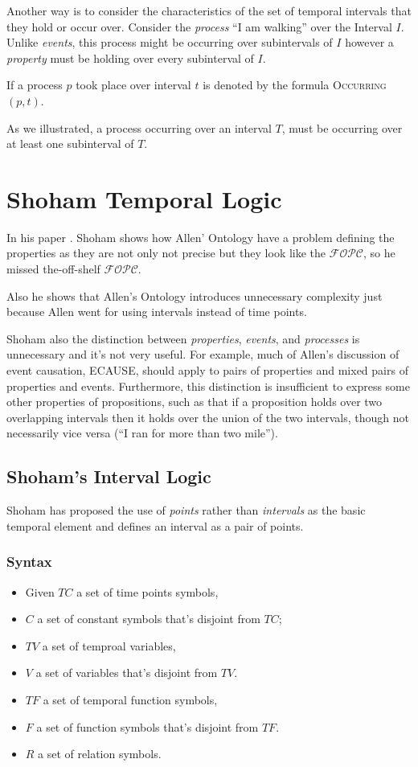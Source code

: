 Another way is to consider the characteristics of the set of temporal intervals that they hold or occur over.
Consider the \textit{process} ``I am walking'' over the Interval $I$. Unlike \textit{events}, this process might be occurring over subintervals of $I$ however a \textit{property} must be holding over every subinterval of $I$.


If a process $p$ took place over interval $t$ is denoted by the formula \textsc{Occurring}$(p,t)$.


As we illustrated, a process occurring over an interval $T$, must be occurring over at least one subinterval of $T$.

\section{Shoham Temporal Logic}

In his paper \cite{shoham1988temporal}.
Shoham shows how Allen' Ontology have a problem defining the properties as they are not only not precise but they look like the $\mathcal{FOPC}$, so he missed the-off-shelf $\mathcal{FOPC}$.

Also he shows that Allen's Ontology introduces unnecessary complexity just because Allen went for using intervals instead of time points.

Shoham also the distinction between \textit{properties}, \textit{events}, and \textit{processes} is unnecessary and it's not very useful.
For example, much of Allen's discussion of event causation, ECAUSE, should apply to pairs of properties and mixed pairs of properties and events. Furthermore, this distinction is insufficient to express some other properties of propositions, such as that if a proposition holds over two overlapping intervals then it holds over
the union of the two intervals, though not necessarily vice versa (``I ran for more than two mile'').


\subsection{Shoham's Interval Logic}
Shoham has proposed the use of \textit{points} rather than \textit{intervals} as the basic temporal element and defines an interval as a pair of points.
\subsubsection{Syntax}
\begin{itemize}
	\item Given $TC$ a set of time points symbols,
	\item $C$ a set of constant symbols that's disjoint from $TC$;
	\item $TV$ a set of temproal variables,
	\item $V$ a set of variables that's disjoint from $TV$.
	\item $TF$ a set of temporal function symbols,
	\item $F$ a set of function symbols that's disjoint from $TF$.
	\item $R$ a set of relation symbols.
\end{itemize}

